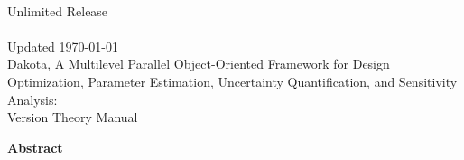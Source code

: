 \documentclass[letterpaper]{book}
\begin{document}
\begin{titlepage}
\setcounter{page}{3}
\begin{center}
{\large \DakotaSANDTheory}\\
{\large Unlimited Release}\\
{\large \DakotaSANDDate}\\
{\large Updated \today}\\

\vspace*{1.5cm}
{\LARGE Dakota, A Multilevel Parallel Object-Oriented Framework for 
Design Optimization, Parameter Estimation, Uncertainty Quantification, 
and Sensitivity Analysis:\\Version \DakotaVersion\space Theory Manual}\\
\vspace*{1cm}

\DakotaAuthorFormatted

\newpage

{\Large \bf Abstract}
\end{center}

\DakotaAbstractShared
\DakotaAbstractTheory

\end{titlepage}

\cleardoublepage
\tableofcontents
\cleardoublepage

%
%










%



\end{document}
